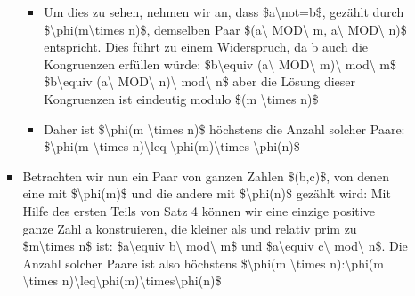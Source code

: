 \documentclass[a4paper]{article}
\begin{document}
\begin{multicols}{3}
\begin{itemize}
\begin{itemize}
\begin{itemize}
                                  \begin{itemize}
                                      \item
                                            Um dies zu sehen, nehmen wir an, dass \$a\textbackslash not=b\$,
                                            gezählt durch \$\textbackslash phi(m\textbackslash times n)\$,
                                            demselben Paar \$(a\textbackslash{} MOD\textbackslash{} m,
                                            a\textbackslash{} MOD\textbackslash{} n)\$ entspricht. Dies
                                            führt zu einem Widerspruch, da b auch die Kongruenzen erfüllen
                                            würde: \$b\textbackslash equiv (a\textbackslash{}
                                            MOD\textbackslash{} m)\textbackslash{} mod\textbackslash{} m\$
                                            \$b\textbackslash equiv (a\textbackslash{} MOD\textbackslash{}
                                            n)\textbackslash{} mod\textbackslash{} n\$ aber die Lösung
                                            dieser Kongruenzen ist eindeutig modulo \$(m
                                            \textbackslash times n)\$
                                      \item
                                            Daher ist \$\textbackslash phi(m \textbackslash times n)\$
                                            höchstens die Anzahl solcher Paare: \$\textbackslash phi(m
                                            \textbackslash times n)\textbackslash leq
                                            \textbackslash phi(m)\textbackslash times
                                            \textbackslash phi(n)\$
                                  \end{itemize}
                            \item
                                  Betrachten wir nun ein Paar von ganzen Zahlen \$(b,c)\$, von denen
                                  eine mit \$\textbackslash phi(m)\$ und die andere mit
                                  \$\textbackslash phi(n)\$ gezählt wird: Mit Hilfe des ersten Teils
                                  von Satz 4 können wir eine einzige positive ganze Zahl a
                                  konstruieren, die kleiner als und relativ prim zu
                                  \$m\textbackslash times n\$ ist: \$a\textbackslash equiv
                                  b\textbackslash{} mod\textbackslash{} m\$ und
                                  \$a\textbackslash equiv c\textbackslash{} mod\textbackslash{} n\$.
                                  Die Anzahl solcher Paare ist also höchstens \$\textbackslash phi(m
                                  \textbackslash times n):\textbackslash phi(m \textbackslash times
                                  n)\textbackslash leq\textbackslash phi(m)\textbackslash times\textbackslash phi(n)\$
                        \end{itemize}
              \end{itemize}
    \end{itemize}



\end{multicols}
\end{document}
